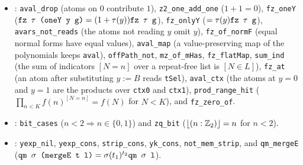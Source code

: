 \begin{itemize}
  \textnormal{\texttt{om8\_\allowbreak{}ex}} ($\omega_8^k = \operatorname{ex}(k/8)$), \textnormal{\texttt{zq\_\allowbreak{}le}} ($\lfloor x\rfloor\in\{0,1\}$),
  \textnormal{\texttt{pn\_\allowbreak{}filter\_\allowbreak{}split}} (a phase splits into the terms failing and passing a filter),
  \textnormal{\texttt{not\_\allowbreak{}hasAny}}, \textnormal{\texttt{pn\_\allowbreak{}update\_\allowbreak{}free}}, and \textnormal{\texttt{fvars\_\allowbreak{}mem}}.
\item {}: \textnormal{\texttt{aval\_\allowbreak{}drop}} (atoms on $0$ contribute $1$), \textnormal{\texttt{z2\_\allowbreak{}one\_\allowbreak{}add\_\allowbreak{}one}}
  ($1+1=0$), \textnormal{\texttt{fz\_\allowbreak{}oneY}} ($\textnormal{\texttt{fz \ensuremath{\tau} (\allowbreak{}oneY y g)}} = (1+\tau(y))\textnormal{\texttt{fz \ensuremath{\tau} g}}$), \textnormal{\texttt{fz\_\allowbreak{}onlyY}}
  ($=\tau(y)\textnormal{\texttt{fz \ensuremath{\tau} g}}$), \textnormal{\texttt{avars\_\allowbreak{}not\_\allowbreak{}reads}} (the atoms not reading $y$ omit $y$),
  \textnormal{\texttt{fz\_\allowbreak{}of\_\allowbreak{}normF}} (equal normal forms have equal values), \textnormal{\texttt{aval\_\allowbreak{}map}} (a value-preserving
  map of the polynomials keeps \textnormal{\texttt{aval}}), \textnormal{\texttt{offPath\_\allowbreak{}not}}, \textnormal{\texttt{mz\_\allowbreak{}of\_\allowbreak{}mHas}},
  \textnormal{\texttt{fz\_\allowbreak{}flatMap}}, \textnormal{\texttt{sum\_\allowbreak{}ind}} (the sum of indicators $[N=n]$ over a repeat-free list is
  $[N\in L]$), \textnormal{\texttt{fz\_\allowbreak{}at}} (an atom after substituting $y:=B$ reads \textnormal{\texttt{tSel}}), \textnormal{\texttt{aval\_\allowbreak{}ctx}}
  (the atoms at $y=0$ and $y=1$ are the products over \textnormal{\texttt{ctx0}} and \textnormal{\texttt{ctx1}}),
  \textnormal{\texttt{prod\_\allowbreak{}range\_\allowbreak{}hit}} ($\prod_{n<K}f(n)^{[N=n]} = f(N)$ for $N<K$), and \textnormal{\texttt{fz\_\allowbreak{}zero\_\allowbreak{}of}}.
\item {}: \textnormal{\texttt{bit\_\allowbreak{}cases}} ($n<2\Rightarrow n\in\{0,1\}$) and \textnormal{\texttt{zq\_\allowbreak{}bit}}
  ($\lfloor(n:\mathbb{Z}_{2})\rfloor = n$ for $n<2$).
\item {}: \textnormal{\texttt{yexp\_\allowbreak{}nil}}, \textnormal{\texttt{yexp\_\allowbreak{}cons}}, \textnormal{\texttt{strip\_\allowbreak{}cons}}, \textnormal{\texttt{yk\_\allowbreak{}cons}},
  \textnormal{\texttt{not\_\allowbreak{}mem\_\allowbreak{}strip}}, and \textnormal{\texttt{qm\_\allowbreak{}mergeE}} ($\textnormal{\texttt{qm \ensuremath{\sigma} (\allowbreak{}mergeE t l)}} = \sigma(t_1)^{t_2}\textnormal{\texttt{qm \ensuremath{\sigma} l}}$).

\end{itemize}
